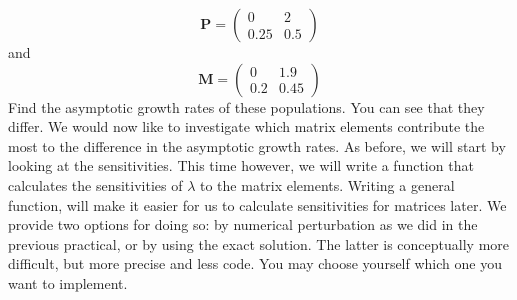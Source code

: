 \documentclass{article}\usepackage[]{graphicx}\usepackage[]{color}
\begin{document}
\begin{equation}
\boldsymbol{P}=\begin{pmatrix}
0&2\\
0.25&0.5
\end{pmatrix}
\end{equation}
and
\begin{equation}
\boldsymbol{M}=\begin{pmatrix}
0&1.9\\
0.2&0.45
\end{pmatrix}
\end{equation}
Find the asymptotic growth rates of these populations. You can see that they differ. We would now like to investigate which matrix elements contribute the most to the difference in the asymptotic growth rates. As before, we will start by looking at the sensitivities. This time however, we will write a function that calculates the sensitivities of $\lambda$ to the matrix elements. Writing a general function, will make it easier for us to calculate sensitivities for matrices later. We provide two options for doing so: by numerical perturbation as we did in the previous practical, or by using the exact solution. The latter is conceptually more difficult, but more precise and less code. You may choose yourself which one you want to implement.
\end{document}
